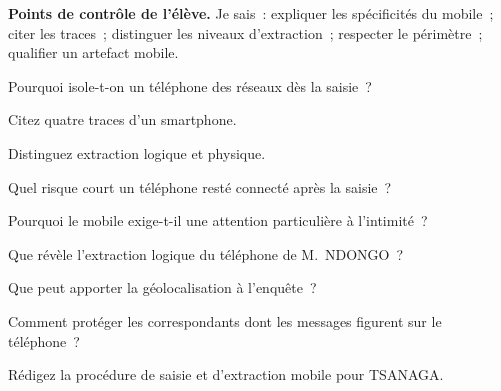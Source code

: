 \begin{boxinfo}
\textbf{Points de contrôle de l'élève.} Je sais~: expliquer les spécificités
du mobile~; citer les traces~; distinguer les niveaux d'extraction~; respecter
le périmètre~; qualifier un artefact mobile.
\end{boxinfo}

\bigskip

\begin{boxexo}[title={\ding{45}\quad Exercice~14.1. Spécificités \niveaubase}]
Pourquoi isole-t-on un téléphone des réseaux dès la saisie~?
\end{boxexo}

\begin{boxexo}[title={\ding{45}\quad Exercice~14.2. Traces \niveaubase}]
Citez quatre traces d'un smartphone.
\end{boxexo}

\begin{boxexo}[title={\ding{45}\quad Exercice~14.3. Niveaux \niveaubase}]
Distinguez extraction logique et physique.
\end{boxexo}

\begin{boxexo}[title={\ding{45}\quad Exercice~14.4. Effacement \niveaumoyen}]
Quel risque court un téléphone resté connecté après la saisie~?
\end{boxexo}

\begin{boxexo}[title={\ding{45}\quad Exercice~14.5. Intimité \niveaumoyen}]
Pourquoi le mobile exige-t-il une attention particulière à l'intimité~?
\end{boxexo}

\begin{boxexo}[title={\ding{45}\quad Exercice~14.6. TSANAGA \niveaumoyen}]
Que révèle l'extraction logique du téléphone de M.~NDONGO~?
\end{boxexo}

\begin{boxexo}[title={\ding{45}\quad Exercice~14.7. Géolocalisation \niveaumoyen}]
Que peut apporter la géolocalisation à l'enquête~?
\end{boxexo}

\begin{boxexo}[title={\ding{45}\quad Exercice~14.8. Tiers \niveaumoyen}]
Comment protéger les correspondants dont les messages figurent sur le
téléphone~?
\end{boxexo}

\begin{boxexo}[title={\ding{45}\quad Exercice~14.9. Procédure \niveauexpert}]
Rédigez la procédure de saisie et d'extraction mobile pour TSANAGA.
\end{boxexo}

